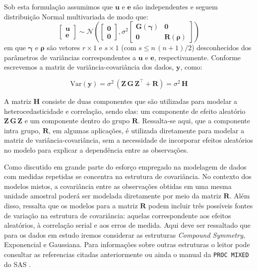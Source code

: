\documentclass[12pt,a4paper,final]{article}
\begin{document}
Sob esta formulação assumimos que $\mathbf{u}$ e $\mathbf{e}$ são independentes e seguem distribuição Normal multivariada
de modo que:
\begin{equation}\label{eq:dist}
\left[\begin{array}{c}
\mathbf{u} \\
\mathbf{e}
\end{array} \right] \sim 
\mathcal{N}\left(
\left[\begin{array}{c}
\bm{0} \\
\bm{0}
\end{array}
\right],
\sigma^2
\left[\begin{array}{cc}
\mathbf{G}(\bm{\gamma}) & \bm{0} \\
\bm{0} & \mathbf{R}(\bm{\rho})                  
\end{array}
\right]
\right)
\end{equation}
em que $ \bm{\gamma} $ e $ \bm{\rho} $ são vetores $ r \times 1 $ e $ s \times 1 $ (com $s \leq n\,(n+1) / 2$)
desconhecidos dos parâmetros de variâncias correspondentes a $ \mathbf{u} $ e $ \mathbf{e} $, respectivamente.
Conforme  escrevemos a matriz de variância-covariância dos dados, $ \mathbf{y} $, como:

\begin{equation}\label{eq:var}
\textrm{Var}(\mathbf{y}) = \sigma^2\,\left(\mathbf{Z}\,\mathbf{G}\,\mathbf{Z}^\top + \mathbf{R}\right) 
= \sigma^2\,\mathbf{H}
\end{equation}

A matriz $ \mathbf{H} $ consiste de duas componentes que são utilizadas para modelar a heterocedasticidade e 
correlação, sendo elas: um componente de efeito aleatório $ \mathbf{Z}\,\mathbf{G}\,\mathbf{Z} $ e um componente
dentro do grupo $ \mathbf{R} $. Ressalta-se aqui, que a componente intra grupo, $ \mathbf{R} $, em algumas 
aplicações, é utilizada diretamente para modelar a matriz de variância-covariância, sem a necessidade de incorporar
efeitos aleatórios no modelo para explicar a dependência entre as observações.

Como discutido em  grande parte do esforço empregado na modelagem de dados com medidas repetidas
se concentra na estrutura de covariância. No contexto dos modelos mistos, a covariância entre as observações
obtidas em uma mesma unidade amostral poderá ser modelada diretamente por meio da matriz $ \mathbf{R} $.
Além disso,  ressalta que os modelos para a matriz $ \mathbf{R} $ podem incluir 
três possíveis fontes de variação na estrutura de covariância: 
aquelas correspondente aos efeitos aleatórios, à correlação serial e aos erros de medida. 
Aqui deve ser ressaltado que para os dados em estudo iremos considerar as estruturas \emph{Compound Symmetry},
Exponencial e Gaussiana. Para informações sobre outras estruturas o leitor pode consultar as referencias citadas
anteriormente ou ainda o manual da \texttt{PROC MIXED} do \textsf{SAS} \cite{MIXED}.
\end{document}
